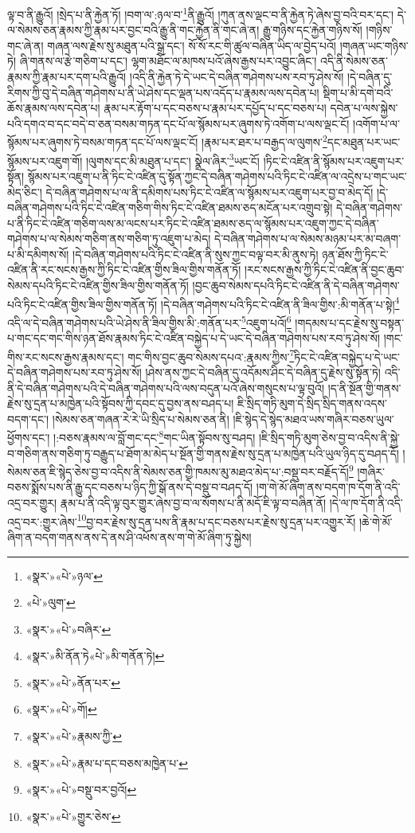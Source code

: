ལྟ་བ་ནི་རྒྱུའོ། །སྲེད་པ་ནི་རྐྱེན་ཏོ། །བག་ལ་:ཉལ་བ་\footnote{«སྣར་»«པེ་»ཉལ་}ནི་རྒྱུའོ། །ཀུན་ནས་ལྡང་བ་ནི་རྐྱེན་ཏེ་ཞེས་བྱ་བའི་བར་དང་། དེ་ལ་སེམས་ཅན་རྣམས་ཀྱི་རྣམ་པར་བྱང་བའི་རྒྱུ་ནི་གང་རྐྱེན་ནི་གང་ཞེ་ན། རྒྱུ་གཉིས་དང་རྐྱེན་གཉིས་སོ། །གཉིས་གང་ཞེ་ན། གཞན་ལས་རྗེས་སུ་མཐུན་པའི་སྒྲ་དང་། སོ་སོ་རང་གི་ཚུལ་བཞིན་ཡིད་ལ་བྱེད་པའོ། །གཞན་ཡང་གཉིས་ཏེ། ཞི་གནས་ལ་རྩེ་གཅིག་པ་དང་། ལྷག་མཐོང་ལ་མཁས་པའོ་ཞེས་རྒྱས་པར་འབྱུང་ཞིང་། འདི་ནི་སེམས་ཅན་རྣམས་ཀྱི་རྣམ་པར་དག་པའི་རྒྱུའོ། །འདི་ནི་རྐྱེན་ཏེ་དེ་ཡང་དེ་བཞིན་གཤེགས་པས་རབ་ཏུ་ཤེས་སོ། །དེ་བཞིན་དུ་རིགས་ཀྱི་བུ་དེ་བཞིན་གཤེགས་པ་ནི་ཡེ་ཤེས་དང་ལྡན་པས་འདོད་པ་རྣམས་ལས་དབེན་པ། སྡིག་པ་མི་དགེ་བའི་ཆོས་རྣམས་ལས་དབེན་པ། རྣམ་པར་རྟོག་པ་དང་བཅས་པ་རྣམ་པར་དཔྱོད་པ་དང་བཅས་པ། དབེན་པ་ལས་སྐྱེས་པའི་དགའ་བ་དང་བདེ་བ་ཅན་བསམ་གཏན་དང་པོ་ལ་སྙོམས་པར་ཞུགས་ཏེ་འགོག་པ་ལས་ལྡང་ངོ། །འགོག་པ་ལ་སྙོམས་པར་ཞུགས་ཏེ་བསམ་གཏན་དང་པོ་ལས་ལྡང་ངོ། །རྣམ་པར་ཐར་པ་བརྒྱད་ལ་ལུགས་\footnote{«པེ་»ལུག་}དང་མཐུན་པར་ཡང་སྙོམས་པར་འཇུག་གོ། །ལུགས་དང་མི་མཐུན་པ་དང་། སྣྲེལ་ཞིར་\footnote{«སྣར་»«པེ་»བཞིར་}ཡང་ངོ། །ཏིང་ངེ་འཛིན་ནི་སྙོམས་པར་འཇུག་པར་སྟོན། སྙོམས་པར་འཇུག་པ་ནི་ཏིང་ངེ་འཛིན་དུ་སྟོན་ཀྱང་དེ་བཞིན་གཤེགས་པའི་ཏིང་ངེ་འཛིན་ལ་འདྲེས་པ་གང་ཡང་མེད་ཅིང་། དེ་བཞིན་གཤེགས་པ་ལ་ནི་དམིགས་པས་ཏིང་ངེ་འཛིན་ལ་སྙོམས་པར་འཇུག་པར་བྱ་བ་མེད་དོ། །དེ་བཞིན་གཤེགས་པའི་ཏིང་ངེ་འཛིན་གཅིག་གིས་ཏིང་ངེ་འཛིན་ཐམས་ཅད་མངོན་པར་འགྲུབ་སྟེ། དེ་བཞིན་གཤེགས་པ་ནི་ཏིང་ངེ་འཛིན་གཅིག་ལས་མ་ལངས་པར་ཏིང་ངེ་འཛིན་ཐམས་ཅད་ལ་སྙོམས་པར་འཇུག་ཀྱང་དེ་བཞིན་གཤེགས་པ་ལ་སེམས་གཅིག་ནས་གཅིག་ཏུ་འཇུག་པ་མེད། དེ་བཞིན་གཤེགས་པ་ལ་སེམས་མཉམ་པར་མ་བཞག་པ་མི་དམིགས་སོ། །དེ་བཞིན་གཤེགས་པའི་ཏིང་ངེ་འཛིན་ནི་སུས་ཀྱང་བལྟ་བར་མི་ནུས་ཏེ། ཉན་ཐོས་ཀྱི་ཏིང་ངེ་འཛིན་ནི་རང་སངས་རྒྱས་ཀྱི་ཏིང་ངེ་འཛིན་གྱིས་ཟིལ་གྱིས་གནོན་ཏོ། །རང་སངས་རྒྱས་ཀྱི་ཏིང་ངེ་འཛིན་ནི་བྱང་ཆུབ་སེམས་དཔའི་ཏིང་ངེ་འཛིན་གྱིས་ཟིལ་གྱིས་གནོན་ཏོ། །བྱང་ཆུབ་སེམས་དཔའི་ཏིང་ངེ་འཛིན་ནི་དེ་བཞིན་གཤེགས་པའི་ཏིང་ངེ་འཛིན་གྱིས་ཟིལ་གྱིས་གནོན་ཏོ། །དེ་བཞིན་གཤེགས་པའི་ཏིང་ངེ་འཛིན་ནི་ཟིལ་གྱིས་:མི་གནོན་པ་སྟེ།\footnote{«སྣར་»མི་ནོན་ཏེ«པེ་»མི་གནོན་ཏེ།} འདི་ལ་དེ་བཞིན་གཤེགས་པའི་ཡེ་ཤེས་ནི་ཟིལ་གྱིས་མི་:གནོན་པར་\footnote{«སྣར་»«པེ་»ནོན་པར་}འཇུག་པའོ།\footnote{«སྣར་»«པེ་»གོ།} །གདམས་པ་དང་རྗེས་སུ་བསྟན་པ་གང་དང་གང་གིས་ཉན་ཐོས་རྣམས་ཏིང་ངེ་འཛིན་བསྐྱེད་པ་དེ་ཡང་དེ་བཞིན་གཤེགས་པས་རབ་ཏུ་ཤེས་སོ། །གང་གིས་རང་སངས་རྒྱས་རྣམས་དང་། གང་གིས་བྱང་ཆུབ་སེམས་དཔའ་:རྣམས་ཀྱིས་\footnote{«སྣར་»«པེ་»རྣམས་ཀྱི་}ཏིང་ངེ་འཛིན་བསྐྱེད་པ་དེ་ཡང་དེ་བཞིན་གཤེགས་པས་རབ་ཏུ་ཤེས་སོ། །ཤེས་ནས་ཀྱང་དེ་བཞིན་དུ་འདོམས་ཤིང་དེ་བཞིན་དུ་རྗེས་སུ་སྟོན་ཏེ། འདི་ནི་དེ་བཞིན་གཤེགས་པའི་དེ་བཞིན་གཤེགས་པའི་ལས་བདུན་པའོ་ཞེས་གསུངས་པ་ལྟ་བུའོ། །ད་ནི་སྔོན་གྱི་གནས་རྗེས་སུ་དྲན་པ་མཁྱེན་པའི་སྟོབས་ཀྱི་དབང་དུ་བྱས་ནས་བཤད་པ། ཇི་སྲིད་གཏི་མུག་དེ་སྲིད་སྲིད་གནས་འདས་བདག་དང་། །སེམས་ཅན་གཞན་རེ་རེ་ཡི་སྲིད་པ་སེམས་ཅན་ནི། །ཇི་སྙེད་དེ་སྙེད་མཐའ་ཡས་གཞིར་བཅས་ཡུལ་ཕྱོགས་དང་། །:བཅས་རྣམས་ལ་བློ་གང་དང་\footnote{«སྣར་»«པེ་»རྣམ་པ་དང་བཅས་མཁྱེན་པ་}གང་ཡིན་སྟོབས་སུ་བཤད། །ཇི་སྲིད་གཏི་མུག་ཅེས་བྱ་བ་འདིས་ནི་སྐྱེ་བ་གཅིག་ནས་གཅིག་ཏུ་བརྒྱུད་པ་ཐོག་མ་མེད་པ་སྔོན་གྱི་གནས་རྗེས་སུ་དྲན་པ་མཁྱེན་པའི་ཡུལ་ཉིད་དུ་བཤད་དོ། །སེམས་ཅན་ཇི་སྙེད་ཅེས་བྱ་བ་འདིས་ནི་སེམས་ཅན་གྱི་ཁམས་མུ་མཐའ་མེད་པ་:བསྡུ་བར་བརྗོད་དོ།\footnote{«སྣར་»«པེ་»བསྡུ་བར་བྱའོ།} །གཞིར་བཅས་སྨོས་པས་ནི་རྒྱུ་དང་བཅས་པ་ཉིད་ཀྱི་སྒོ་ནས་དེ་བསྡུ་བ་བཤད་དོ། །ག་གེ་མོ་ཞིག་ནས་བདག་ཁ་དོག་ནི་འདི་འདྲ་བར་གྱུར། རྣམ་པ་ནི་འདི་ལྟ་བུར་གྱུར་ཞེས་བྱ་བ་ལ་སོགས་པ་ནི་མདོ་ཇི་ལྟ་བ་བཞིན་ནོ། །དེ་ལ་ཁ་དོག་ནི་འདི་འདྲ་བར་:གྱུར་ཞེས་\footnote{«སྣར་»«པེ་»གྱུར་ཅེས་}བྱ་བར་རྗེས་སུ་དྲན་པས་ནི་རྣམ་པ་དང་བཅས་པར་རྗེས་སུ་དྲན་པར་འགྱུར་རོ། །ཆེ་གེ་མོ་ཞིག་ན་བདག་གནས་ནས་དེ་ནས་ཤི་འཕོས་ནས་ག་གེ་མོ་ཞིག་ཏུ་སྐྱེས། 